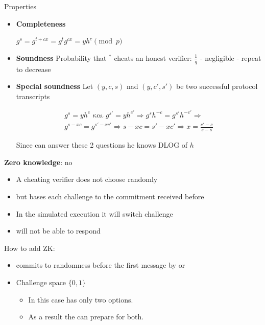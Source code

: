 \documentclass[handouts]{beamer}
\begin{document}
\begin{frame}[allowframebreaks]{Properties}

\begin{itemize}
\item \textbf{Completeness}
    \begin{center}
    $g^s = g^{t+cx} = g^t g^{cx} = yh^c \pmod{p}$
    \end{center}
 
\item \textbf{Soundness} 
Probability that \prv$^*$ cheats an honest verifier: $\frac{1}{q}$ - negligible - repeat to decrease
 
\item \textbf{Special soundness}
Let $(y,c,s)$ nad  $(y,c',s')$ be two successful protocol transcripts
 
\begin{align*}
 g^s = yh^c  \text{ και }  g^{s'} = yh^{c'}  \Rightarrow  g^s h^{-c}   = g^{s'} h^{-c'}  \Rightarrow \\
 g^{s-xc} = g^{s'-xc'} \Rightarrow  s-xc = s'-xc' \Rightarrow  
 x = \frac{c'-c}{s-s}
\end{align*}
 
Since \prv can answer these 2 questions he knows DLOG of $h$
\end{itemize}

\framebreak

\textbf{Zero knowledge}: \alert{no}
 
\begin{itemize}
\item A cheating verifier does not choose randomly  
\item but bases each challenge to the commitment received before \siml  
\item In the simulated execution it will switch challenge  
\item \siml will not be able to respond 
\end{itemize}

How to add ZK:  

\begin{itemize}
\item \ver commits to randomness before the first message by  \prv or 
\item Challenge space $\{ 0 , 1 \} $ 
\begin{itemize}
\item In this case \ver has only two options. 
\item As a result the \siml can prepare for both.
\end{itemize} 
\end{itemize} 


\end{frame}
\end{document}
